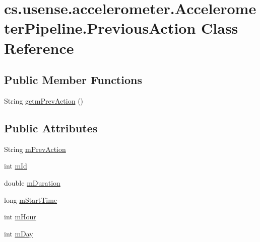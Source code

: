 \hypertarget{classcs_1_1usense_1_1accelerometer_1_1_accelerometer_pipeline_1_1_previous_action}{}\section{cs.\+usense.\+accelerometer.\+Accelerometer\+Pipeline.\+Previous\+Action Class Reference}
\label{classcs_1_1usense_1_1accelerometer_1_1_accelerometer_pipeline_1_1_previous_action}
\subsection*{Public Member Functions}
\begin{DoxyCompactItemize}
\item 
String \hyperlink{classcs_1_1usense_1_1accelerometer_1_1_accelerometer_pipeline_1_1_previous_action_a288f3408bb5090eb068f7b03d470bff4}{getm\+Prev\+Action} ()
\end{DoxyCompactItemize}
\subsection*{Public Attributes}
\begin{DoxyCompactItemize}
\item 
String \hyperlink{classcs_1_1usense_1_1accelerometer_1_1_accelerometer_pipeline_1_1_previous_action_a2ff7dbe285a08af27eb3de452ef97ade}{m\+Prev\+Action}
\item 
int \hyperlink{classcs_1_1usense_1_1accelerometer_1_1_accelerometer_pipeline_1_1_previous_action_aab60173c4c19a8581713b3f41b85abb0}{m\+Id}
\item 
double \hyperlink{classcs_1_1usense_1_1accelerometer_1_1_accelerometer_pipeline_1_1_previous_action_a535d8abc90661161d8f3460a86a2439c}{m\+Duration}
\item 
long \hyperlink{classcs_1_1usense_1_1accelerometer_1_1_accelerometer_pipeline_1_1_previous_action_a158be18c85f46142511e3307f3321ca0}{m\+Start\+Time}
\item 
int \hyperlink{classcs_1_1usense_1_1accelerometer_1_1_accelerometer_pipeline_1_1_previous_action_ac7be20fcd4beb6eb2e8880cdeb18648f}{m\+Hour}
\item 
int \hyperlink{classcs_1_1usense_1_1accelerometer_1_1_accelerometer_pipeline_1_1_previous_action_a0d11e69e931a05fa8f66d776b54ff997}{m\+Day}
\end{DoxyCompactItemize}


